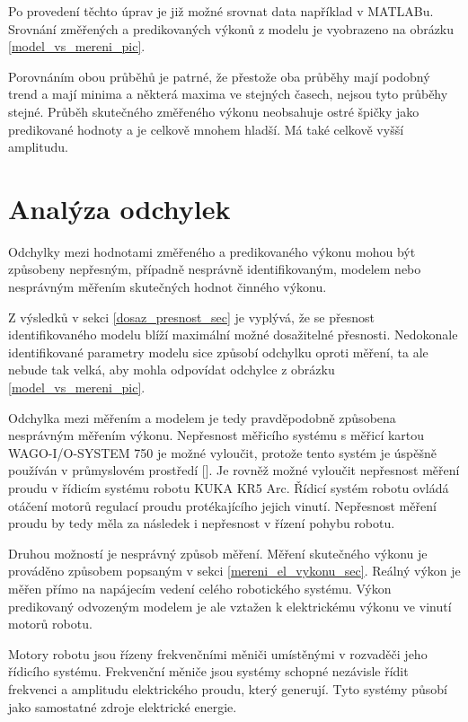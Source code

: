 Po provedení těchto úprav je již možné srovnat data například v MATLABu. Srovnání změřených a predikovaných výkonů z modelu je vyobrazeno na obrázku \ref{model_vs_mereni_pic}.

Porovnáním obou průběhů je patrné, že přestože oba průběhy mají podobný trend a mají minima a některá maxima ve stejných časech, nejsou tyto průběhy stejné. Průběh skutečného změřeného výkonu neobsahuje ostré špičky jako predikované hodnoty a je celkově mnohem hladší. Má také celkově vyšší amplitudu.  

\section{Analýza odchylek}
\label{analyza_odchylek_sec}

Odchylky mezi hodnotami změřeného a predikovaného výkonu mohou být způsobeny nepřesným, případně nesprávně identifikovaným, modelem nebo nesprávným měřením skutečných hodnot činného výkonu.

Z výsledků v sekci \ref{dosaz_presnost_sec} je vyplývá, že se přesnost identifikovaného modelu blíží maximální možné dosažitelné přesnosti. Nedokonale identifikované parametry modelu sice způsobí odchylku oproti měření, ta ale nebude tak velká, aby mohla odpovídat odchylce z obrázku \ref{model_vs_mereni_pic}.

Odchylka mezi měřením a modelem je tedy pravděpodobně způsobena nesprávným měřením výkonu. Nepřesnost měřicího systému s měřicí kartou WAGO-I/O-SYSTEM 750 je možné vyloučit, protože tento systém je úspěšně používán v průmyslovém prostředí [\cite{vojtech_pavlik}]. Je rovněž možné vyloučit nepřesnost měření proudu v řídicím systému robotu KUKA KR5 Arc. Řídicí systém robotu ovládá otáčení motorů regulací proudu protékajícího jejich vinutí. Nepřesnost měření proudu by tedy měla za následek i nepřesnost v řízení pohybu robotu. 

Druhou možností je nesprávný způsob měření. Měření skutečného výkonu je prováděno způsobem popsaným v sekci \ref{mereni_el_vykonu_sec}. Reálný výkon je měřen přímo na napájecím vedení celého robotického systému. Výkon predikovaný odvozeným modelem je ale vztažen k elektrickému výkonu ve vinutí motorů robotu. 

Motory robotu jsou řízeny frekvenčními měniči umístěnými v rozvaděči jeho řídicího systému. Frekvenční měniče jsou systémy schopné nezávisle řídit frekvenci a amplitudu elektrického proudu, který generují. Tyto systémy působí jako samostatné zdroje elektrické energie. 

